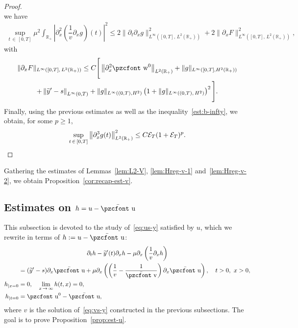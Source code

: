 \documentclass[10pt]{amsart}
\theoremstyle{definition}\newtheorem{defi}[theo]{Definition}\newtheorem{rema}[theo]{Remark}\newtheorem{exam}[theo]{Example}\newtheorem{exem}[theo]{Example}\newtheorem{nota}[theo]{Notation}
\newcommand{\mathpzc}[1]{\text{\pzcfont #1}}
\newcommand{\R}{\mathbb{R}}
\newcommand{\p}{\partial}
\newcommand{\bv}{\bar{\mathpzc{v}}}
\newcommand{\bu}{\bar{\mathpzc{u}}}
\newcommand{\cE}{\mathcal E}
\newcommand{\tu}{\mathpzc{u}}
\newcommand{\tw}{\mathpzc{w}}
\newcommand{\ty}{\widetilde{y}}
\begin{document}
\begin{proof}
\begin{equation*}
\end{equation*}
we have
\begin{align*}
 \sup_{t\,\in\,[0,T]} \mu^2 \int_{\R_+}\left|\partial^2_x\left(\dfrac{1}{v} \partial_{x}g\right)(t)\right|^2 
\leq 2 \|\partial_t \partial_{x}g \|_{L^\infty\left([0,T],\,L^2(\R_+)\right)}^2 + 2 \| \partial_{x} F\|_{L^\infty\left([0,T],\,L^2(\R_+)\right)}^2,
\end{align*}
with
\begin{multline*}
\|\partial_x F\|_{L^\infty\left([0,T],\,L^2(\R_+)\right)}
\leq C \Bigg[\left\|\partial^2_x \tw^0\right\|_{L^2(\R_+)}
+\|g\|_{L^\infty\left([0,T], H^2(\R_+)\right)}  \\
+\left\|\ty' - s\right\|_{L^\infty(0,T)} + \|g\|_{L^\infty\left((0,T), H^2\right)}\left(1 +\|g\|_{L^\infty((0,T),\, H^2)}\right)^2
\Bigg].
\end{multline*}
Finally, using the previous estimates as well as the inequality~\eqref{est:b-infty}, we obtain, for some $p\geq 1$,
\[
\sup_{t\, \in\,[0,T]} \left\|\partial^3_x g (t)\right\|_{L^2(\R_+)}^2
\leq C \cE_T (1+ \cE_T)^p.\qedhere
\]
\end{proof}


Gathering the estimates of Lemmas~\ref{lem:L2-V}, \ref{lem:Hreg-v-1} and~\ref{lem:Hreg-v-2}, we obtain Proposition~\ref{cor:recap-est-v}.



\subsection{Estimates on \texorpdfstring{$h=u-\bu$}{h}}\label{sec:us}

This subsection is devoted to the study of~\eqref{eq:us-y} satisfied by $u$, which we rewrite in terms of $h:=u-\bu$:
\begin{multline}\label{eq:u}
\partial_t h - \ty'(t) \p_x h - \mu \partial_x\left(\dfrac{1}{v}\partial_x h \right)
\\
\begin{aligned}
&= (\ty'-s)\p_x \bu + \mu \p_x\left(\left(\frac{1}{v}- \frac{1}{\bv}\right) \p_x \bu\right),\quad t>0, \ x>0,\\
h_{|x=0} &=0, \quad \lim_{x\,\to\,\infty} h(t,x)=0,\\
h_{|t=0} &=\tu^0-\bu,
\end{aligned}
\end{multline}
where $v$ is the solution of~\eqref{eq:vs-y} constructed in the previous subsections. The goal is to prove Proposition~\ref{prop:est-u}.
\end{document}
